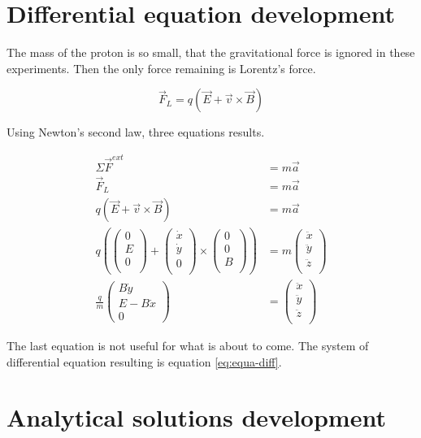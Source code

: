 \documentclass[a4paper,12pt,twoside]{article}
\begin{document}
\section{Differential equation development} \label{ann:dev-eq-diff}
The mass of the proton is so small, that the gravitational force is ignored in these experiments.
Then the only force remaining is Lorentz's force.

\begin{equation}
	\vec{F}_L = q(\vec{E} + \vec{v}\times\vec{B})
	\label{eq:lorentz-force}
\end{equation}

Using Newton's second law, three equations results.

\begin{align*}
	\Sigma\vec{F}^{ext} &= m\vec{a} \\
	\vec{F}_L &= m\vec{a}\\
	q(\vec{E} + \vec{v}\times\vec{B}) &= m\vec{a} \\
	q\left( \begin{pmatrix} 0\\ E\\ 0\\ \end{pmatrix} + \begin{pmatrix} \dot{x}\\ \dot{y}\\ 0\\ \end{pmatrix} \times \begin{pmatrix} 0\\ 0\\ B\\ \end{pmatrix}\right) &= m\begin{pmatrix} \ddot{x}\\ \ddot{y}\\ \ddot{z}\\ \end{pmatrix} \\
	\frac{q}{m}\begin{pmatrix} B\dot{y}\\ E - B\dot{x}\\ 0 \end{pmatrix} &= \begin{pmatrix} \ddot{x}\\ \ddot{y}\\ \ddot{z}\\ \end{pmatrix}
\end{align*}

The last equation is not useful for what is about to come.
The system of differential equation resulting is equation \ref{eq:equa-diff}.

\section{Analytical solutions development} \label{ann:dev-sol-ana}
\end{document}
